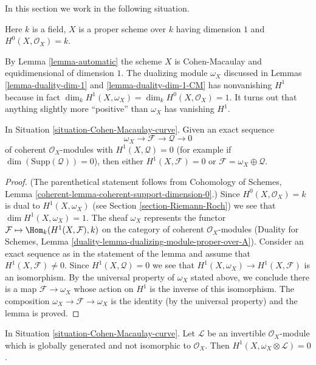\noindent
In this section we work in the following situation.

\begin{situation}
\label{situation-Cohen-Macaulay-curve}
Here $k$ is a field, $X$ is a proper scheme over $k$ having dimension $1$
and $H^0(X, \mathcal{O}_X) = k$.
\end{situation}

\noindent
By Lemma \ref{lemma-automatic} the scheme $X$ is Cohen-Macaulay and
equidimensional of dimension $1$. The dualizing module $\omega_X$
discussed in Lemmas \ref{lemma-duality-dim-1} and
\ref{lemma-duality-dim-1-CM} has nonvanishing $H^1$ because in fact
$\dim_k H^1(X, \omega_X) = \dim_k H^0(X, \mathcal{O}_X) = 1$. It turns out
that anything slightly more ``positive'' than $\omega_X$ has vanishing $H^1$.

\begin{lemma}
\label{lemma-vanishing}
In Situation \ref{situation-Cohen-Macaulay-curve}. Given an exact sequence
$$
\omega_X \to \mathcal{F} \to \mathcal{Q} \to 0
$$
of coherent $\mathcal{O}_X$-modules with $H^1(X, \mathcal{Q}) = 0$
(for example if $\dim(\text{Supp}(\mathcal{Q})) = 0$), then
either $H^1(X, \mathcal{F}) = 0$ or
$\mathcal{F} = \omega_X \oplus \mathcal{Q}$.
\end{lemma}

\begin{proof}
(The parenthetical statement follows from
Cohomology of Schemes, Lemma \ref{coherent-lemma-coherent-support-dimension-0}.)
Since $H^0(X, \mathcal{O}_X) = k$ is dual to $H^1(X, \omega_X)$
(see Section \ref{section-Riemann-Roch})
we see that $\dim H^1(X, \omega_X) = 1$. The sheaf $\omega_X$
represents the functor
$\mathcal{F} \mapsto \Hom_k(H^1(X, \mathcal{F}), k)$
on the category of coherent $\mathcal{O}_X$-modules
(Duality for Schemes, Lemma
\ref{duality-lemma-dualizing-module-proper-over-A}).
Consider an exact sequence as in the statement of the lemma
and assume that $H^1(X, \mathcal{F}) \not = 0$. Since
$H^1(X, \mathcal{Q}) = 0$ we see that
$H^1(X, \omega_X) \to H^1(X, \mathcal{F})$ is an isomorphism.
By the universal property of $\omega_X$ stated above, we conclude there
is a map $\mathcal{F} \to \omega_X$ whose action on $H^1$ is the inverse
of this isomorphism. The composition $\omega_X \to \mathcal{F} \to \omega_X$
is the identity (by the universal property) and the lemma is proved.
\end{proof}

\begin{lemma}
\label{lemma-vanishing-twist}
In Situation \ref{situation-Cohen-Macaulay-curve}. Let
$\mathcal{L}$ be an invertible $\mathcal{O}_X$-module which is
globally generated and not isomorphic to $\mathcal{O}_X$. Then
$H^1(X, \omega_X \otimes \mathcal{L}) = 0$.
\end{lemma}

